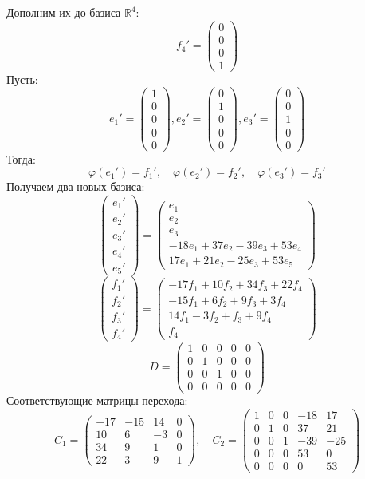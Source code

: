 \documentclass[a4paper]{article}
\newcommand{\mat}[1]{\begin{pmatrix} #1 \end{pmatrix}}
\renewcommand{\phi}{\varphi}
\newcommand{\RR}{\mathbb{R}}
\begin{document}
\begin{enumerate}
    Дополним их до базиса $\RR^4$:
    $$f_4' = \mat{0\\0\\0\\1}$$
    Пусть:
    $$e_1' = \mat{1\\0\\0\\0\\0}, e_2' = \mat{0\\1\\0\\0\\0}, 
    e_3' = \mat{0\\0\\1\\0\\0}$$
    Тогда:
    $$\phi(e_1') = f_1', \quad \phi(e_2') = f_2', \quad \phi(e_3') = f_3'$$
    Получаем два новых базиса:
    $$\mat{e_1'\\ e_2'\\ e_3'\\ e_4'\\ e_5'} =
     \mat{e_1\\ e_2\\ e_3\\ -18e_1+37e_2-39e_3+53e_4 \\ 17e_1+21e_2-25e_3+53e_5}$$
    $$\mat{f_1'\\ f_2'\\ f_3'\\ f_4'} = 
    \mat{-17f_1+10f_2+34f_3+22f_4\\-15f_1+6f_2+9f_3+3f_4 
    \\ 14f_1 -3 f_2 + f_3 + 9f_4 \\ f_4}$$
    \[
     D = \begin{pmatrix}
     1 & 0 & 0 & 0 & 0 \\
     0 & 1 & 0 & 0 & 0 \\
     0 & 0 & 1 & 0 & 0 \\
     0 & 0 & 0 & 0 & 0
     \end{pmatrix}
     \]
    Соответствующие матрицы перехода:
    $$
    C_{1}=\begin{pmatrix}
    -17 & -15 & 14 & 0 \\
    10 & 6 & -3 & 0 \\
    34 & 9 & 1 & 0 \\
    22 & 3 & 9 & 1
    \end{pmatrix}, \quad C_{2}=\begin{pmatrix}
        1 & 0 & 0 & -18 & 17 \\
        0 & 1 & 0 & 37 & 21 \\
        0 & 0 & 1 & -39 & -25 \\
        0 & 0 & 0 & 53 & 0 \\
        0 & 0 & 0 & 0 & 53
        \end{pmatrix}
    $$\\
    

\end{enumerate}
\end{document}
